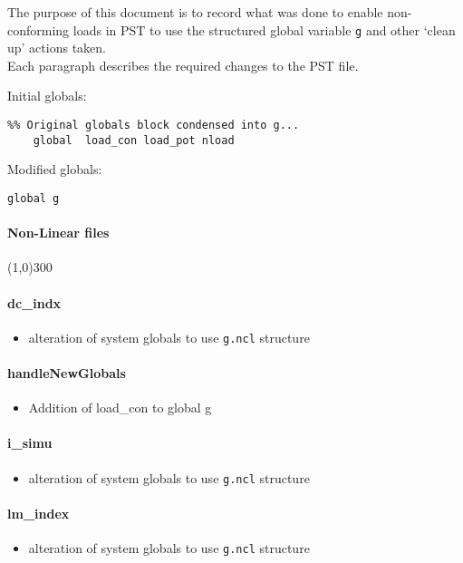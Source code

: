 \documentclass[12pt]{article}
\begin{document}
The purpose of this document is to record what was done to enable non-conforming loads in PST to use the structured global variable \verb|g| and other `clean up' actions taken. \\
Each paragraph describes the required changes to the PST file.

Initial globals:
\begin{verbatim}
%% Original globals block condensed into g...
    global  load_con load_pot nload
\end{verbatim}

Modified globals:
\begin{verbatim}
global g
\end{verbatim}
\paragraph{Non-Linear files}\line(1,0){300}
\paragraph{dc\_indx}
	\begin{itemize}
		\item alteration of system globals to use \verb|g.ncl| structure
	\end{itemize}
\paragraph{handleNewGlobals}
	\begin{itemize}
		\item Addition of load\_con to global g
	\end{itemize}
\paragraph{i\_simu}
	\begin{itemize}
		\item alteration of system globals to use \verb|g.ncl| structure
	\end{itemize}
\paragraph{lm\_index}
	\begin{itemize}
		\item alteration of system globals to use \verb|g.ncl| structure
	\end{itemize}
\end{document}
